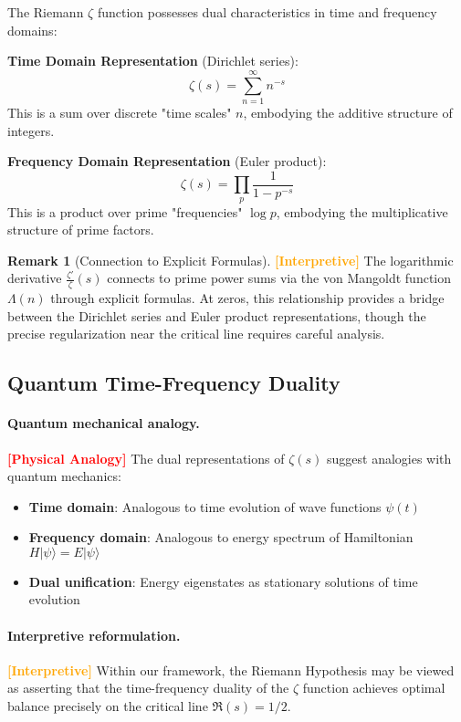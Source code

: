 \documentclass[12pt]{article}
\theoremstyle{plain}
\theoremstyle{definition}
\newtheorem{remark}[theorem]{Remark}
\newcommand{\statusinterp}{\textcolor{orange}{\textbf{[Interpretive]}}}
\newcommand{\statusanalogy}{\textcolor{red}{\textbf{[Physical Analogy]}}}
\begin{document}
The Riemann $\zeta$ function possesses dual characteristics in time and frequency domains:

\textbf{Time Domain Representation} (Dirichlet series):
$$\zeta(s) = \sum_{n=1}^{\infty} n^{-s}$$
This is a sum over discrete "time scales" $n$, embodying the additive structure of integers.

\textbf{Frequency Domain Representation} (Euler product):
$$\zeta(s) = \prod_{p} \frac{1}{1-p^{-s}}$$
This is a product over prime "frequencies" $\log p$, embodying the multiplicative structure of prime factors.

\begin{remark}[Connection to Explicit Formulas] \statusinterp
The logarithmic derivative $\frac{\zeta'}{\zeta}(s)$ connects to prime power sums via the von Mangoldt function $\Lambda(n)$ through explicit formulas. At zeros, this relationship provides a bridge between the Dirichlet series and Euler product representations, though the precise regularization near the critical line requires careful analysis.
\end{remark}

\subsection{Quantum Time-Frequency Duality}

\paragraph{Quantum mechanical analogy.} \statusanalogy
The dual representations of $\zeta(s)$ suggest analogies with quantum mechanics:
\begin{itemize}
\item \textbf{Time domain}: Analogous to time evolution of wave functions $\psi(t)$
\item \textbf{Frequency domain}: Analogous to energy spectrum of Hamiltonian $H|\psi\rangle = E|\psi\rangle$  
\item \textbf{Dual unification}: Energy eigenstates as stationary solutions of time evolution
\end{itemize}

\paragraph{Interpretive reformulation.} \statusinterp
Within our framework, the Riemann Hypothesis may be viewed as asserting that the time-frequency duality of the $\zeta$ function achieves optimal balance precisely on the critical line $\Re(s) = 1/2$.
\end{document}
